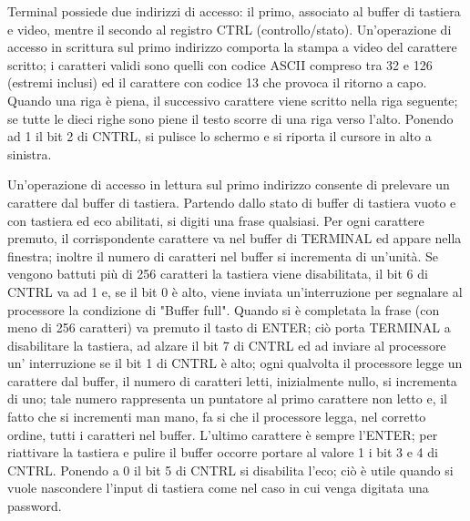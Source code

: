 Terminal possiede due indirizzi di accesso: il primo, associato al buffer di tastiera e video, mentre il secondo al registro CTRL (controllo/stato). Un'operazione di accesso in scrittura sul primo  indirizzo comporta la stampa a video del carattere scritto; i caratteri validi sono quelli  con codice ASCII compreso tra 32 e 126 (estremi inclusi) ed il carattere con codice 13 che provoca il ritorno a capo. Quando una riga è piena, il successivo carattere viene scritto nella riga 
seguente; se tutte le dieci righe sono piene il testo scorre di una riga verso l'alto. Ponendo ad 1 il bit 2 di CNTRL, 
si pulisce lo schermo e si riporta il cursore in alto a sinistra. 

Un'operazione di accesso in lettura sul primo indirizzo consente di prelevare un carattere dal buffer di tastiera. 
Partendo dallo stato di buffer di tastiera vuoto e con tastiera ed eco abilitati, si digiti una frase qualsiasi. Per ogni carattere premuto, il corrispondente carattere va nel buffer di TERMINAL ed appare nella finestra; inoltre il 
numero di caratteri nel buffer si incrementa di un'unità. Se vengono battuti più di 256 caratteri la tastiera viene 
disabilitata, il bit 6 di CNTRL va ad 1 e, se il bit 0 è alto, viene inviata un'interruzione per segnalare al processore la condizione di "Buffer full". Quando si è completata la frase (con meno di 256 caratteri) va premuto il tasto di ENTER; ciò porta TERMINAL a disabilitare la tastiera, ad alzare il  bit 7 di CNTRL ed ad inviare al processore un' interruzione se il bit 1 di CNTRL è alto; ogni qualvolta il processore legge un carattere dal buffer, il numero di caratteri letti, inizialmente nullo, si incrementa di uno; tale numero rappresenta un puntatore al primo carattere non letto e, il fatto che si incrementi man mano, fa si che il processore legga, nel  corretto ordine, tutti i caratteri nel buffer. L'ultimo carattere è sempre l'ENTER; per riattivare la tastiera e pulire il buffer occorre portare al valore 1 i bit 3 e 4 di CNTRL. 
Ponendo a 0 il bit 5 di CNTRL si disabilita l'eco; ciò è utile quando si vuole nascondere l'input di tastiera come 
nel caso in cui venga digitata una password. 





